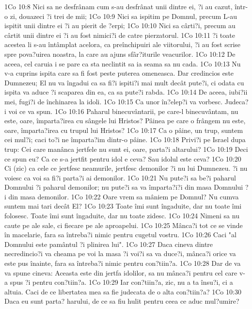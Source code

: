 1Co 10:8  Nici sa ne desfrânam cum s-au desfrânat unii dintre ei, ?i au cazut, într-o zi, douazeci ?i trei de mii;
1Co 10:9  Nici sa ispitim pe Domnul, precum L-au ispitit unii dintre ei ?i au pierit de ?erpi;
1Co 10:10  Nici sa cârti?i, precum au cârtit unii dintre ei ?i au fost nimici?i de catre pierzatorul.
1Co 10:11  ?i toate acestea li s-au întâmplat acelora, ca preînchipuiri ale viitorului, ?i au fost scrise spre pova?uirea noastra, la care au ajuns sfâr?iturile veacurilor.
1Co 10:12  De aceea, cel caruia i se pare ca sta neclintit sa ia seama sa nu cada.
1Co 10:13  Nu v-a cuprins ispita care sa fi fost peste puterea omeneasca. Dar credincios este Dumnezeu; El nu va îngadui ca sa fi?i ispiti?i mai mult decât pute?i, ci odata cu ispita va aduce ?i scaparea din ea, ca sa pute?i rabda.
1Co 10:14  De aceea, iubi?ii mei, fugi?i de închinarea la idoli.
1Co 10:15  Ca unor în?elep?i va vorbesc. Judeca?i voi ce va spun.
1Co 10:16  Paharul binecuvântarii, pe care-l binecuvântam, nu este, oare, împarta?irea cu sângele lui Hristos? Pâinea pe care o frângem nu este, oare, împarta?irea cu trupul lui Hristos?
1Co 10:17  Ca o pâine, un trup, suntem cei mul?i; caci to?i ne împarta?im dintr-o pâine.
1Co 10:18  Privi?i pe Israel dupa trup: Cei care manânca jertfele nu sunt ei, oare, parta?i altarului?
1Co 10:19  Deci ce spun eu? Ca ce s-a jertfit pentru idol e ceva? Sau idolul este ceva?
1Co 10:20  Ci (zic) ca cele ce jertfesc neamurile, jertfesc demonilor ?i nu lui Dumnezeu. ?i nu voiesc ca voi sa fi?i parta?i ai demonilor.
1Co 10:21  Nu pute?i sa be?i paharul Domnului ?i paharul demonilor; nu pute?i sa va împarta?i?i din masa Domnului ?i din masa demonilor.
1Co 10:22  Oare vrem sa mâniem pe Domnul? Nu cumva suntem mai tari decât El?
1Co 10:23  Toate îmi sunt îngaduite, dar nu toate îmi folosesc. Toate îmi sunt îngaduite, dar nu toate zidesc.
1Co 10:24  Nimeni sa nu caute pe ale sale, ci fiecare pe ale aproapelui.
1Co 10:25  Mânca?i tot ce se vinde în macelarie, fara sa întreba?i nimic pentru cugetul vostru.
1Co 10:26  Caci "al Domnului este pamântul ?i plinirea lui".
1Co 10:27  Daca cineva dintre necredincio?i va cheama pe voi la masa ?i voi?i sa va duce?i, mânca?i orice va este pus înainte, fara sa întreba?i nimic pentru con?tiin?a.
1Co 10:28  Dar de va va spune cineva: Aceasta este din jertfa idolilor, sa nu mânca?i pentru cel care v-a spus ?i pentru con?tiin?a.
1Co 10:29  Iar con?tiin?a, zic, nu a ta însu?i, ci a altuia. Caci de ce libertatea mea sa fie judecata de o alta con?tiin?a?
1Co 10:30  Daca eu sunt parta? harului, de ce sa fiu hulit pentru ceea ce aduc mul?umire?
